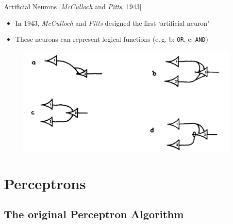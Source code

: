 \begin{frame}{Artificial Neurons [\textit{McCulloch} and \textit{Pitts}, 1943]}{}
	\begin{itemize}
		\item In 1943, \textit{McCulloch} and \textit{Pitts} designed the first `artificial neuron'
		\item These neurons can represent logical functions (e.\,g. b: \texttt{OR}, c: \texttt{AND})
	\end{itemize}
	
	\begin{figure}
		\centering
		\includegraphics[scale=0.25]{10_deep_learning/02_img/mcculloch_pitts}
	\end{figure}
\end{frame}


\section{Perceptrons}

\subsection{The original Perceptron Algorithm}

